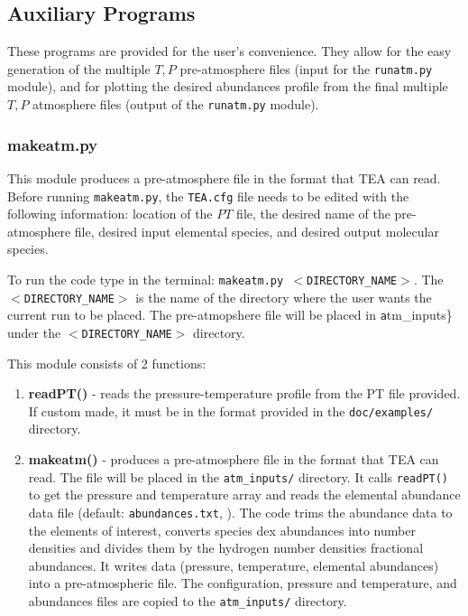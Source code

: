 \subsection{Auxiliary Programs}

These programs are provided for the user's convenience. They allow for
the easy generation of the multiple ${T, P}$ pre-atmosphere files
(input for the \texttt{runatm.py} module), and for plotting the
desired abundances profile from the final multiple ${T, P}$ atmosphere
files (output of the \texttt{runatm.py} module).


\subsubsection{makeatm.py}
\label{makeatm}

This module produces a pre-atmosphere file in the format that TEA can
read. Before running \texttt {makeatm.py}, the \texttt {TEA.cfg} file
needs to be edited with the following information: location of the
$PT$ file, the desired name of the pre-atmosphere file, desired input
elemental species, and desired output molecular species.

To run the code type in the terminal: \texttt {makeatm.py
$<$DIRECTORY\_NAME$>$}. \newline The \texttt{$<$DIRECTORY\_NAME$>$} is
the name of the directory where the user wants the current run to be
placed. The pre-atmopshere file will be placed in \texttt
atm\_inputs\} under the \newline \texttt{$<$DIRECTORY\_NAME$>$}
directory.

This module consists of 2 functions:
{
\begin{enumerate}
\setlength\itemsep{0ex}
\setlength\topsep{0ex}
\setlength\partopsep{0ex}
\setlength\parsep{0ex}

   \item {\bf readPT()} - reads the pressure-temperature profile from
   the PT file provided. If custom made, it must be in the format
   provided in the \texttt {doc/examples/} directory.  \item {\bf
   makeatm()} - produces a pre-atmosphere file in the format that TEA
   can read. The file will be placed in the \texttt {atm\_inputs/}
   directory. It calls \texttt {readPT()} to get the pressure and
   temperature array and reads the elemental abundance data file
   (default: \texttt
   {abundances.txt}, \citet{AsplundEtal2009-SunAbundances}). The code
   trims the abundance data to the elements of interest, converts
   species dex abundances into number densities and divides them by
   the hydrogen number densities fractional abundances. It writes data
   (pressure, temperature, elemental abundances) into a
   pre-atmospheric file. The configuration, pressure and temperature,
   and abundances files are copied to the \texttt {atm\_inputs/}
   directory.
\end{enumerate}
}




